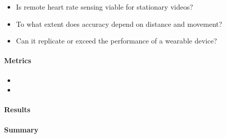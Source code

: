 \begin{itemize}
    \item Is remote heart rate sensing viable for stationary videos?
    \item To what extent does accuracy depend on distance and movement?
    \item Can it replicate or exceed the performance of a wearable device?
\end{itemize}

\paragraph{Metrics}
\begin{itemize}
    \item 
    \item 
\end{itemize}
\paragraph{Results}

\paragraph{Summary}

